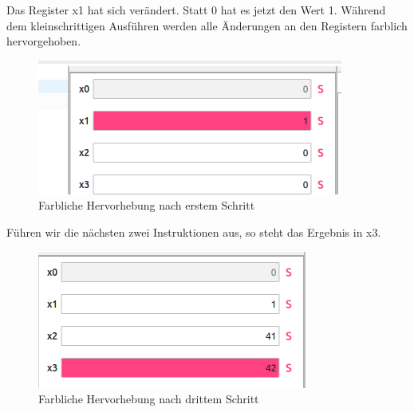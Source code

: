 Das Register x1 hat sich verändert. Statt 0 hat es jetzt den Wert 1. Während dem
kleinschrittigen Ausführen werden alle Änderungen an den Registern farblich
hervorgehoben.

\begin{figure}[H]
	\centering
	\includegraphics[scale=1.0]{Images/first-steps-4.png}
	\caption{Farbliche Hervorhebung nach erstem Schritt}
\end{figure}

Führen wir die nächsten zwei Instruktionen aus, so steht das Ergebnis in x3.
\begin{figure}[H]
	\centering
	\includegraphics[scale=1.0]{Images/first-steps-5.png}
	\caption{Farbliche Hervorhebung nach drittem Schritt}
\end{figure}

